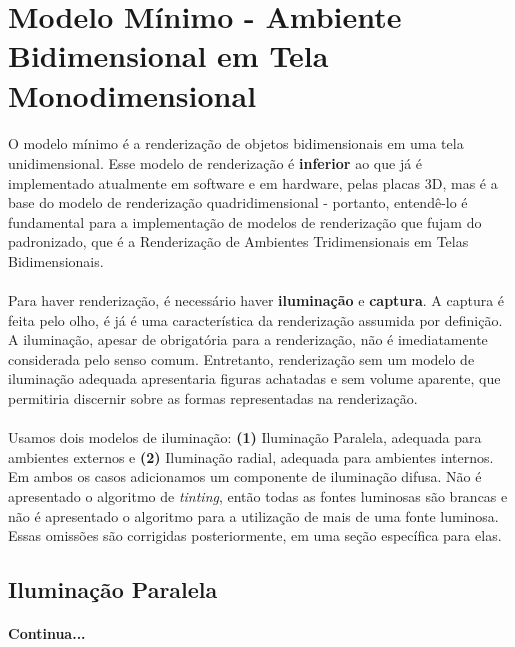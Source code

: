 \documentclass{article}
\begin{document}
	\section{Modelo Mínimo - Ambiente Bidimensional em Tela Monodimensional}
	
	\paragraph{}
	O modelo mínimo é a renderização de objetos bidimensionais em uma tela unidimensional. Esse modelo de renderização é \textbf{inferior} ao que já é implementado atualmente em software e em hardware, pelas placas 3D, mas é a base do modelo de renderização quadridimensional - portanto, entendê-lo é fundamental para a implementação de modelos de renderização que fujam do padronizado, que é a Renderização de Ambientes Tridimensionais em Telas Bidimensionais.
	
	\paragraph{}
	Para haver renderização, é necessário haver \textbf{iluminação} e \textbf{captura}. A captura é feita pelo olho, é já é uma característica da renderização assumida por definição. A iluminação, apesar de obrigatória para a renderização, não é imediatamente considerada pelo senso comum. Entretanto, renderização sem um modelo de iluminação adequada apresentaria figuras achatadas e sem volume aparente, que permitiria discernir sobre as formas representadas na renderização.
	
	\paragraph{}
	Usamos dois modelos de iluminação: \textbf{(1)} Iluminação Paralela, adequada para ambientes externos e \textbf{(2)} Iluminação radial, adequada para ambientes internos. Em ambos os casos adicionamos um componente de iluminação difusa. Não é apresentado o algoritmo de \textit{tinting}, então todas as fontes luminosas são brancas e não é apresentado o algoritmo para a utilização de mais de uma fonte luminosa. Essas omissões são corrigidas posteriormente, em uma seção específica para elas.
	
	\subsection{Iluminação Paralela}
	
	\paragraph{}
	\textbf{Continua...}
	
\end{document}
